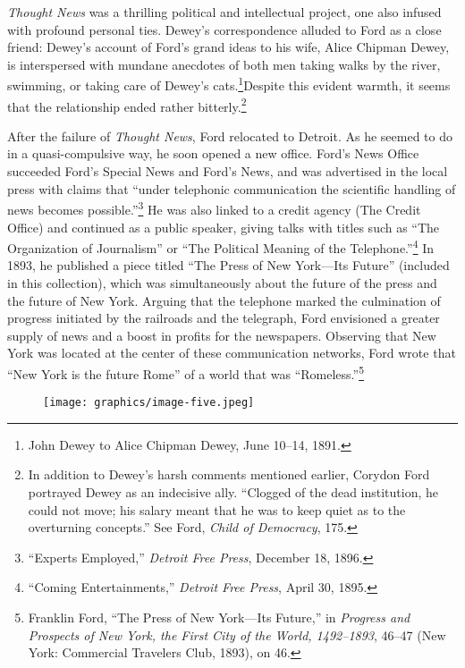 \documentclass[twoside,symmetric,nobib,justified]{tufte-book}
\begin{document}
\emph{Thought News} was a thrilling political and intellectual project,
one also infused with profound personal ties. Dewey's correspondence
alluded to Ford as a close friend: Dewey's account of Ford's grand ideas
to his wife, Alice Chipman Dewey, is interspersed with mundane anecdotes
of both men taking walks by the river, swimming, or taking care of
Dewey's cats.\footnote{John Dewey to Alice Chipman Dewey, June 10--14,
  1891.}\newpage\noindent Despite this evident warmth, it seems that the relationship
ended rather bitterly.\footnote{In addition to Dewey's harsh comments
  mentioned earlier, Corydon Ford portrayed Dewey as an indecisive ally.
  ``Clogged of the dead institution, he could not move; his salary meant
  that he was to keep quiet as to the overturning concepts.'' See Ford,
  \emph{Child of Democracy}, 175.}

After the failure of \emph{Thought News}, Ford relocated to Detroit. As
he seemed to do in a quasi-compulsive way, he soon opened a new office.
Ford's News Office succeeded Ford's Special News and Ford's News, and
was advertised in the local press with claims that ``under telephonic
communication the scientific handling of news becomes
possible.''\footnote{``Experts Employed,'' \emph{Detroit Free Press},
  December 18, 1896.} He was also linked to a credit agency (The Credit
Office) and continued as a public speaker, giving talks with titles such
as ``The Organization of Journalism'' or ``The Political Meaning of the
Telephone.''\footnote{``Coming Entertainments,'' \emph{Detroit Free
  Press}, April 30, 1895.} In 1893, he published a piece titled ``The
Press of New York---Its Future'' (included in this collection), which
was simultaneously about the future of the press and the future of New
York. Arguing that the telephone marked the culmination of progress
initiated by the railroads and the telegraph, Ford envisioned a greater
supply of news and a boost in profits for the newspapers. Observing that
New York was located at the center of these communication networks, Ford
wrote that ``New York is the future Rome'' of a world that was
``Romeless.''\footnote{Franklin Ford, ``The Press of New York---Its
  Future,'' in \emph{Progress and Prospects of New York, the First City
  of the World, 1492--1893}, 46--47 (New York: Commercial Travelers
  Club, 1893), on 46.}

\begin{figure}
   \texttt{[image: graphics/image-five.jpeg]}
   \label{fig:fig5}
\end{figure}
\end{document}
